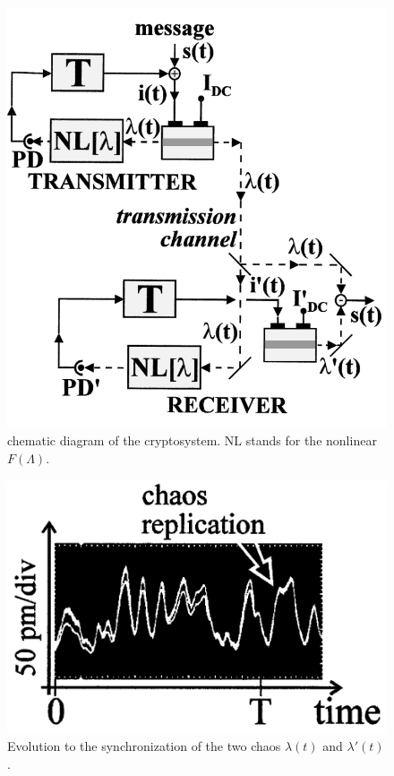 \begin{minipage}{0.45\textwidth}
    \begin{figure}[h]
    \centering
    \includegraphics[width=1\textwidth]{images/e_opt-sinchro.png}
    \caption{chematic diagram of the cryptosystem. NL stands
	for the nonlinear $F(\Lambda)$.}
\end{figure}
\end{minipage}
\hfill
\begin{minipage}{0.45\textwidth}
    \begin{figure}[h]
        \centering
        \includegraphics[width=1\textwidth]{images/e_compared.png}
        \caption{Evolution to the synchronization of the two chaos $\lambda(t)$ and $\lambda'(t)$.}
    \end{figure}    
\end{minipage}
